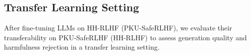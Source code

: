 
% 
% 

\vspace{-8pt}
\subsection{Transfer Learning Setting}
\vspace{-3pt}
After fine-tuning LLMs on HH-RLHF (PKU-SafeRLHF), we evaluate their transferability on PKU-SafeRLHF (HH-RLHF) to assess generation quality and harmfulness rejection in a transfer learning setting.
\vspace{-2pt}

